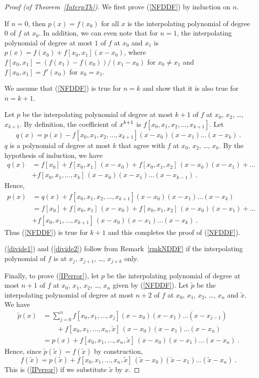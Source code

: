 \begin{proof}[Proof (of Theorem~\ref{InterpTh})]
We first prove (\ref{NFDDF}) by induction on $n$.

If $n=0$, then $p(x) = f(x_0)$ for all $x$ is the interpolating
polynomial of degree $0$ of $f$ at $x_0$.  In addition, we can even
note that for $n=1$, the interpolating polynomial of degree at
most $1$ of $f$ at $x_0$ and $x_1$ is
$p(x) = f(x_0) + f[x_0,x_1](x-x_0)$, where
$f[x_0,x_1] = (f(x_1)-f(x_0))/(x_1-x_0)$ for $x_0 \neq x_1$ and
$f[x_0,x_1] = f'(x_0)$ for $x_0 = x_1$.

We assume that (\ref{NFDDF}) is true for $n=k$ and show that it is
also true for $n=k+1$.

Let $p$ be the interpolating polynomial of degree at most $k+1$ of $f$
at $x_0$, $x_2$, \ldots, $x_{k+1}$.  By definition, the coefficient of
$\displaystyle x^{k+1}$ is $f[x_0, x_1, x_2, \ldots, x_{k+1}]$.  Let
\[
q(x) = p(x) - f[x_0, x_1, x_2, \ldots, x_{k+1}]
(x-x_0)(x-x_1) \ldots (x-x_k) \ .
\]
$q$ is a polynomial of degree at most $k$ that agree with $f$ at
$x_0$, $x_2$, \ldots, $x_k$.
By the hypothesis of induction, we have
\begin{align*}
q(x) &= f[x_0]+f[x_0,x_1]\,(x-x_0) +
f[x_0,x_1,x_2]\,(x-x_0)(x-x_1) + \ldots \\
 &+f[x_0,x_1,\ldots,x_k]\,(x-x_0)(x-x_1)\ldots(x-x_{k-1}) \ .
\end{align*}
Hence,
\begin{align*}
p(x) &= q(x) + f[x_0, x_1, x_2, \ldots, x_{k+1}]
(x-x_0)(x-x_1) \ldots (x-x_k) \\
&= f[x_0]+f[x_0,x_1]\,(x-x_0) +
f[x_0,x_1,x_2]\,(x-x_0)(x-x_1) + \ldots \\
&+f[x_0,x_1,\ldots,x_{k+1}]\,(x-x_0)(x-x_1)\ldots(x-x_k) \ .
\end{align*}
Thus (\ref{NFDDF}) is true for $k+1$ and this completes the proof of
(\ref{NFDDF}).

(\ref{divide1}) and (\ref{divide2}) follow from 
Remark~\ref{rmkNDDF} if the interpolating polynomial of $f$ is at $x_j$,
$x_{j+1}$, \ldots, $x_{j+k}$ only.

Finally, to prove (\ref{IPerror}), let $p$ be the interpolating
polynomial of degree at most $n+1$ of $f$ at $x_0$, $x_1$, $x_2$,
\ldots, $x_n$ given by (\ref{NFDDF}).  Let $\tilde{p}$ be the
interpolating polynomial of degree at most $n+2$ of $f$ at $x_0$,
$x_1$, $x_2$, \ldots, $x_n$ and $\tilde{x}$.  We have
\begin{align*}
\tilde{p}(x) &= \sum_{j=0}^n f[x_0, x_1, \ldots, x_j]
(x-x_0)(x-x_1)\ldots(x-x_{j-1}) \\
&\qquad+ f[x_0,x_1,\dots,x_n,\tilde{x}]\,(x-x_0)(x-x_1)\ldots(x-x_n) \\
&= p(x) + f[x_0,x_1,\dots,x_n,\tilde{x}]\,(x-x_0)(x-x_1)\ldots(x-x_n) \ .
\end{align*}
Hence, since $\tilde{p}(\tilde{x}) = f(\tilde{x})$ by construction,
\[
f(\tilde{x})
= p(\tilde{x}) + f[x_0,x_1,\ldots,x_n,\tilde{x}]\,
(\tilde{x}-x_0)(\tilde{x}-x_1)\ldots(\tilde{x}-x_n) \ .
\]
This is (\ref{IPerror}) if we substitute $\tilde{x}$ by $x$.
\end{proof}

